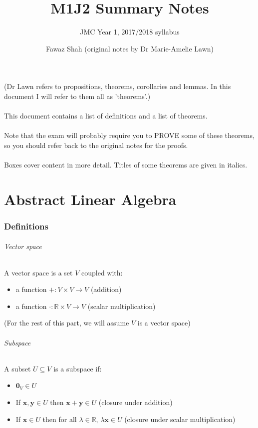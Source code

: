 \documentclass{scrartcl}
\title{M1J2 Summary Notes}
\subtitle{JMC Year 1, 2017/2018 syllabus}
\date{}
\author{Fawaz Shah (original notes by Dr Marie-Amelie Lawn)}
\newcommand{\R}{\mathbb{R}}
\renewcommand{\vec}[1]{\mathbf{#1}}
\begin{document}
\large
\maketitle
\noindent (Dr Lawn refers to propositions, theorems, corollaries and lemmas. In this document I will refer to them all as 'theorems'.)
\\\\
This document contains a list of definitions and a list of theorems.
\\\\
Note that the exam will probably require you to PROVE some of these theorems, so you should refer back to the original notes for the proofs.
\\\\
Boxes cover content in more detail. Titles of some theorems are given in italics.
\tableofcontents
\newpage
\part{Abstract Linear Algebra}

\section{Definitions}

\paragraph{Vector space}
A vector space is a set $ V $ coupled with:
\begin{itemize}
\item a function $ + : V \times V \to V $ (addition)
\item a function $ \cdot : \R \times V \to V $ (scalar multiplication)
\end{itemize}
(For the rest of this part, we will assume $ V $ is a vector space)

\paragraph{Subspace}
A subset $ U \subseteq V $ is a subspace if:
\begin{itemize}
\item $ \vec{0}_{V} \in U $
\item If $ \vec{x}, \vec{y} \in U $ then $ \vec{x + y} \in U $ (closure under addition)
\item If $ \vec{x} \in U $ then for all $ \lambda \in \R $, $ \lambda\vec{x} \in U $ (closure under scalar multiplication)
\end{itemize}
\end{document}
